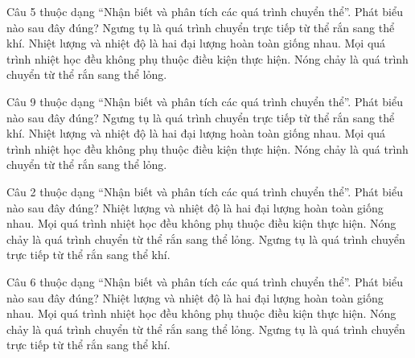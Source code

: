 \begin{ex}
Câu 5 thuộc dạng “Nhận biết và phân tích các quá trình chuyển thể”. Phát biểu nào sau đây đúng?
\choice
{Ngưng tụ là quá trình chuyển trực tiếp từ thể rắn sang thể khí.}
{Nhiệt lượng và nhiệt độ là hai đại lượng hoàn toàn giống nhau.}
{Mọi quá trình nhiệt học đều không phụ thuộc điều kiện thực hiện.}
{\True Nóng chảy là quá trình chuyển từ thể rắn sang thể lỏng.}
\end{ex}

\begin{ex}
Câu 9 thuộc dạng “Nhận biết và phân tích các quá trình chuyển thể”. Phát biểu nào sau đây đúng?
\choice
{Ngưng tụ là quá trình chuyển trực tiếp từ thể rắn sang thể khí.}
{Nhiệt lượng và nhiệt độ là hai đại lượng hoàn toàn giống nhau.}
{Mọi quá trình nhiệt học đều không phụ thuộc điều kiện thực hiện.}
{\True Nóng chảy là quá trình chuyển từ thể rắn sang thể lỏng.}
\end{ex}

\begin{ex}
Câu 2 thuộc dạng “Nhận biết và phân tích các quá trình chuyển thể”. Phát biểu nào sau đây đúng?
\choice
{Nhiệt lượng và nhiệt độ là hai đại lượng hoàn toàn giống nhau.}
{Mọi quá trình nhiệt học đều không phụ thuộc điều kiện thực hiện.}
{\True Nóng chảy là quá trình chuyển từ thể rắn sang thể lỏng.}
{Ngưng tụ là quá trình chuyển trực tiếp từ thể rắn sang thể khí.}
\end{ex}

\begin{ex}
Câu 6 thuộc dạng “Nhận biết và phân tích các quá trình chuyển thể”. Phát biểu nào sau đây đúng?
\choice
{Nhiệt lượng và nhiệt độ là hai đại lượng hoàn toàn giống nhau.}
{Mọi quá trình nhiệt học đều không phụ thuộc điều kiện thực hiện.}
{\True Nóng chảy là quá trình chuyển từ thể rắn sang thể lỏng.}
{Ngưng tụ là quá trình chuyển trực tiếp từ thể rắn sang thể khí.}
\end{ex}

